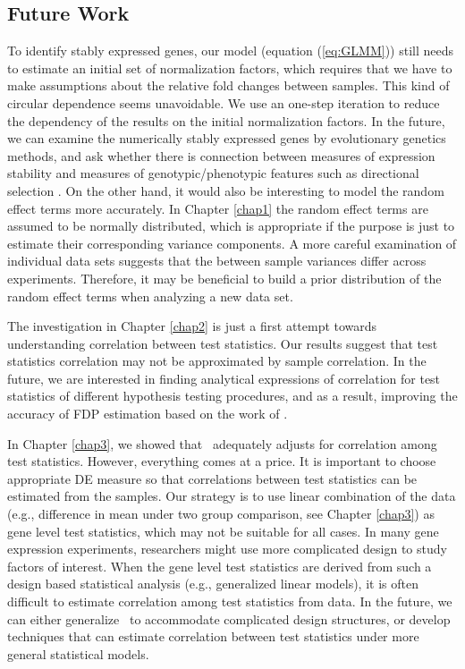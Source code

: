 \subsection{Future Work}
To identify stably expressed genes, our model (equation (\ref{eq:GLMM})) still needs to estimate an 
initial set of normalization factors, which requires that we have to make assumptions about the 
relative fold changes between samples. This kind of circular dependence seems unavoidable. We use 
an one-step iteration to reduce the dependency of the results on the initial normalization factors. 
In the future, we can examine the numerically stably expressed genes by evolutionary genetics 
methods, and ask whether there is connection between measures of expression stability and measures 
of genotypic/phenotypic features such as directional selection \citep{sabeti2006positive}.
On the other hand, it would also be interesting to model the random effect terms more accurately. 
In Chapter \ref{chap1} the random effect terms are assumed to be normally distributed, which is 
appropriate 
if the purpose is just to estimate their corresponding variance components. A more careful 
examination of individual data sets suggests that the between sample variances differ across 
experiments. Therefore, it may be beneficial to build a prior distribution of the random effect 
terms when analyzing a new data set. 

The investigation in Chapter \ref{chap2} is just a first attempt towards understanding correlation 
between  test statistics. Our results suggest that test statistics correlation may not be 
approximated 
by sample correlation. In the future, we are interested in finding analytical expressions of 
correlation for test statistics of different hypothesis testing procedures, and as a result, 
improving the accuracy of FDP estimation based on the work of \citet{efron2007correlation}. 

In Chapter \ref{chap3}, we showed that \OurMethod~adequately adjusts for correlation among test 
statistics. However, everything comes at a price. 
It is important to choose appropriate DE measure so that correlations between test statistics can 
be estimated from the samples. Our strategy is to use linear combination of the data (e.g., 
difference in mean under two group comparison, see Chapter \ref{chap3}) as gene level test 
statistics, which may not be suitable for all cases. In many gene expression experiments, 
researchers  might use more complicated design to study factors of interest. When the gene level 
test statistics are derived from such a design based statistical analysis (e.g., generalized 
linear models), it is often difficult to estimate correlation among test statistics from data. In 
the future, we can either generalize \OurMethod~to accommodate complicated design structures, or 
develop techniques that can estimate correlation between test statistics under 
more general statistical models.  










